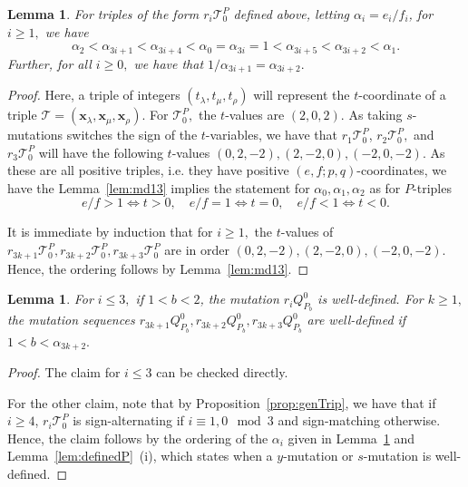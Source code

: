 \documentclass[11pt, reqno]{amsart}
\newtheorem{lemma}[thm]{Lemma}
\theoremstyle{remark}
\numberwithin{equation}{subsection}
\numberwithin{figure}{section}
\theoremstyle{customremark}
\newcommand{\Tt}{\mathcal{T}}
\newcommand{\al}{{\alpha}}
\newcommand{\la}{{\lambda}}
\begin{document}
\begin{lemma} \label{lem:alPSordering}
  For triples of the form $r_i\Tt_0^P$ defined above, letting $\al_i=e_i/f_i$,
for $i \geq 1,$ we have
\[ \al_2 < \al_{3i+1} <\al_{3i+4} <\al_0=\al_{3i}=1< \al_{3i+5}<\al_{3i+2}<\al_1.\]
Further, for all $i\geq 0,$ we have that $1/\al_{3i+1}=\al_{3i+2}.$


\end{lemma}
\begin{proof}
    Here, a triple of integers $(t_\la,t_\mu,t_\rho)$ will represent the $t$-coordinate of a triple $\Tt=(\bm{x}_\la,\bm{x}_\mu,\bm{x}_\rho).$
    For $\Tt_0^P,$ the $t$-values are $(2,0,2).$ As taking $s$-mutations switches the sign of the $t$-variables, we have that $r_1\Tt_0^P$, $r_2\Tt_0^P,$ and $r_3\Tt_0^P$ will have the following $t$-values $(0,2,-2),(2,-2,0),(-2,0,-2).$ As these are all positive triples, i.e. they have positive $(e,f;p,q)$-coordinates, we have the Lemma~\ref{lem:md13} implies the statement for $\al_0,\al_1,\al_2$ as for $P$-triples
    \[ e/f>1 \iff t>0, \quad e/f=1 \iff t=0, \quad e/f<1 \iff t<0.\]

   It is immediate by induction that for $i \geq 1,$ the $t$-values of $r_{3k+1}\Tt_0^P,r_{3k+2}\Tt_0^P,r_{3k+3}\Tt_0^P$ are in order $(0,2,-2),(2,-2,0),(-2,0,-2).$ Hence, the ordering follows by Lemma~\ref{lem:md13}. 
    
  
\end{proof}

\begin{lemma} \label{lem:alPSordering2}
For $i \leq 3,$ if $1 < b < 2$, the mutation $r_iQ_{P_b}^0$ is well-defined. For $k \geq 1,$ the mutation sequences
$r_{3k+1}Q_{P_b}^0,r_{3k+2}Q_{P_b}^0,r_{3k+3}Q_{P_b}^0$ are well-defined if $1 < b < \al_{3k+2}.$


\end{lemma}
\begin{proof}
The claim for $i \leq 3$ can be checked directly. 

For the other claim, note that by Proposition~\ref{prop:genTrip}, we have that if $i \geq 4$, $r_i\Tt_0^P$ is sign-alternating if $i \equiv 1,0 \mod{3}$ and sign-matching otherwise. Hence, the claim follows by the ordering of the $\al_i$ given in Lemma~\ref{lem:alPSordering} and Lemma~\ref{lem:definedP}~(i), which states when a $y$-mutation or $s$-mutation is well-defined. 

 
\end{proof}
\end{document}
